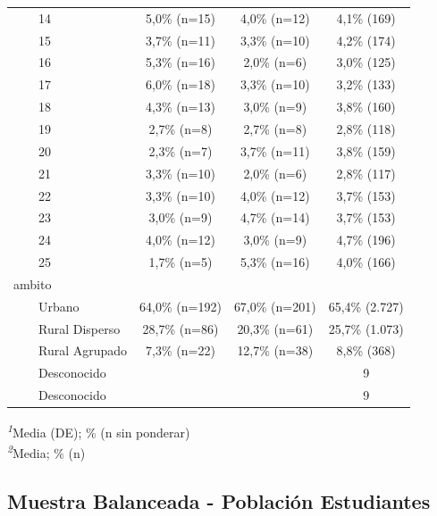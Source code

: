 \documentclass[
  spanish,
  a4paper,
]{scrreprt}
\begin{document}
\begin{table}
{\begin{tabular*}{\linewidth}{@{\extracolsep{\fill}}lccc}
    14 & 5,0\% (n=15) & 4,0\% (n=12) & 4,1\% (169) \\ 
    15 & 3,7\% (n=11) & 3,3\% (n=10) & 4,2\% (174) \\ 
    16 & 5,3\% (n=16) & 2,0\% (n=6) & 3,0\% (125) \\ 
    17 & 6,0\% (n=18) & 3,3\% (n=10) & 3,2\% (133) \\ 
    18 & 4,3\% (n=13) & 3,0\% (n=9) & 3,8\% (160) \\ 
    19 & 2,7\% (n=8) & 2,7\% (n=8) & 2,8\% (118) \\ 
    20 & 2,3\% (n=7) & 3,7\% (n=11) & 3,8\% (159) \\ 
    21 & 3,3\% (n=10) & 2,0\% (n=6) & 2,8\% (117) \\ 
    22 & 3,3\% (n=10) & 4,0\% (n=12) & 3,7\% (153) \\ 
    23 & 3,0\% (n=9) & 4,7\% (n=14) & 3,7\% (153) \\ 
    24 & 4,0\% (n=12) & 3,0\% (n=9) & 4,7\% (196) \\ 
    25 & 1,7\% (n=5) & 5,3\% (n=16) & 4,0\% (166) \\ 
ambito &  &  &  \\ 
    Urbano & 64,0\% (n=192) & 67,0\% (n=201) & 65,4\% (2.727) \\ 
    Rural Disperso & 28,7\% (n=86) & 20,3\% (n=61) & 25,7\% (1.073) \\ 
    Rural Agrupado & 7,3\% (n=22) & 12,7\% (n=38) & 8,8\% (368) \\ 
    Desconocido &  &  & 9 \\ 
    Desconocido &  &  & 9 \\ 
\bottomrule
\end{tabular*}
\begin{minipage}{\linewidth}
\textsuperscript{\textit{1}}Media (DE); \% (n sin ponderar)\\
\textsuperscript{\textit{2}}Media; \% (n)\\
\end{minipage}

}

\end{table}%

\subsection{Muestra Balanceada - Población
Estudiantes}\label{sec-cubo_estudiantes}
\end{document}
